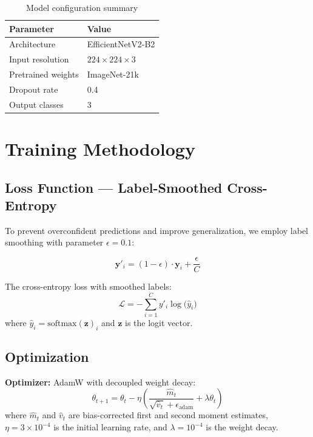 \documentclass[10pt,a4paper,twocolumn]{article}
\begin{document}
\begin{table}[H]
\centering
\caption{Model configuration summary}
\label{tab:model_config}
\begin{tabular}{ll}
\toprule
\textbf{Parameter} & \textbf{Value} \\
\midrule
Architecture & EfficientNetV2-B2 \\
Input resolution & $224 \times 224 \times 3$ \\
Pretrained weights & ImageNet-21k \\
Dropout rate & 0.4 \\
Output classes & 3 \\
\bottomrule
\end{tabular}
\end{table}

\vspace{-8pt}
\section{Training Methodology}

\subsection{Loss Function --- Label-Smoothed Cross-Entropy}

To prevent overconfident predictions and improve generalization, we employ label smoothing with parameter $\epsilon = 0.1$:

\begin{equation}
\mathbf{y}'_i = (1 - \epsilon)\cdot\mathbf{y}_i + \frac{\epsilon}{C}
\label{eq:smooth}
\end{equation}

The cross-entropy loss with smoothed labels:
\begin{equation}
\mathcal{L} = -\sum_{i=1}^{C} y'_i \log\big(\hat{y}_i\big)
\label{eq:loss}
\end{equation}
where $\hat{y}_i = \text{softmax}(\mathbf{z})_i$ and $\mathbf{z}$ is the logit vector.

\subsection{Optimization}

\textbf{Optimizer:} AdamW with decoupled weight decay:
\begin{equation}
\theta_{t+1} = \theta_t - \eta \left( \frac{\hat{m}_t}{\sqrt{\hat{v}_t} + \epsilon_{\text{adam}}} + \lambda \theta_t \right)
\label{eq:adamw}
\end{equation}
where $\hat{m}_t$ and $\hat{v}_t$ are bias-corrected first and second moment estimates, $\eta = 3\times10^{-4}$ is the initial learning rate, and $\lambda = 10^{-4}$ is the weight decay.
\end{document}
